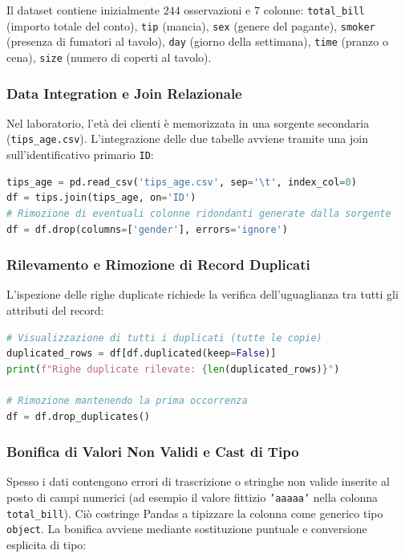 Il dataset contiene inizialmente $244$ osservazioni e $7$ colonne: \texttt{total\_bill} (importo totale del conto), \texttt{tip} (mancia), \texttt{sex} (genere del pagante), \texttt{smoker} (presenza di fumatori al tavolo), \texttt{day} (giorno della settimana), \texttt{time} (pranzo o cena), \texttt{size} (numero di coperti al tavolo).

\FloatBarrier
\subsubsection{Data Integration e Join Relazionale}

Nel laboratorio, l'età dei clienti è memorizzata in una sorgente secondaria (\texttt{tips\_age.csv}). L'integrazione delle due tabelle avviene tramite una join sull'identificativo primario \texttt{ID}:

\begin{lstlisting}[language=Python, style=code]
tips_age = pd.read_csv('tips_age.csv', sep='\t', index_col=0)
df = tips.join(tips_age, on='ID')
# Rimozione di eventuali colonne ridondanti generate dalla sorgente
df = df.drop(columns=['gender'], errors='ignore')
\end{lstlisting}

\FloatBarrier
\subsubsection{Rilevamento e Rimozione di Record Duplicati}

L'ispezione delle righe duplicate richiede la verifica dell'uguaglianza tra tutti gli attributi del record:

\begin{lstlisting}[language=Python, style=code]
# Visualizzazione di tutti i duplicati (tutte le copie)
duplicated_rows = df[df.duplicated(keep=False)]
print(f"Righe duplicate rilevate: {len(duplicated_rows)}")

# Rimozione mantenendo la prima occorrenza
df = df.drop_duplicates()
\end{lstlisting}

\FloatBarrier
\subsubsection{Bonifica di Valori Non Validi e Cast di Tipo}

Spesso i dati contengono errori di trascrizione o stringhe non valide inserite al posto di campi numerici (ad esempio il valore fittizio \texttt{'aaaaa'} nella colonna \texttt{total\_bill}). Ciò costringe Pandas a tipizzare la colonna come generico tipo \texttt{object}. La bonifica avviene mediante sostituzione puntuale e conversione esplicita di tipo:

